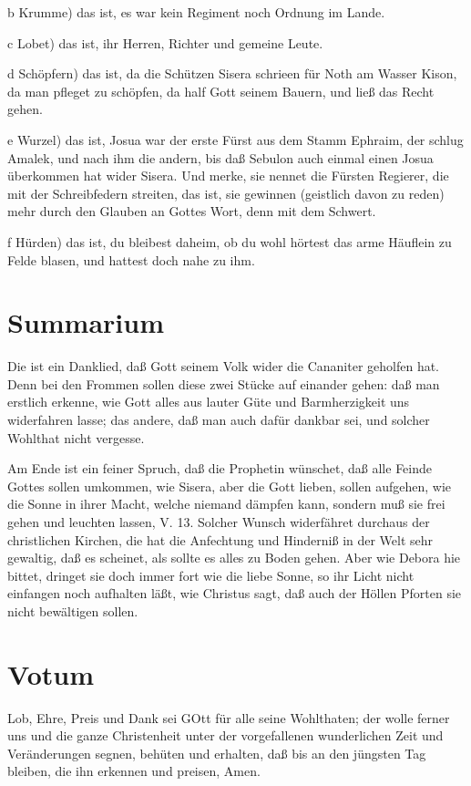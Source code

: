 b Krumme) das ist, es war kein Regiment noch Ordnung im Lande.

c Lobet) das ist, ihr Herren, Richter und gemeine Leute.

d Schöpfern) das ist, da die Schützen Sisera schrieen für Noth am Wasser Kison, da man pfleget zu schöpfen, da half Gott seinem Bauern, und ließ das Recht gehen.

e Wurzel) das ist, Josua war der erste Fürst aus dem Stamm Ephraim, der schlug Amalek, und nach ihm die andern, bis daß Sebulon auch einmal einen Josua überkommen hat wider Sisera. Und merke, sie nennet die Fürsten Regierer, die mit der Schreibfedern streiten, das ist, sie gewinnen (geistlich davon zu reden) mehr durch den Glauben an Gottes Wort, denn mit dem Schwert.

f Hürden) das ist, du bleibest daheim, ob du wohl hörtest das arme Häuflein zu Felde blasen, und hattest doch nahe zu ihm.
\section{Summarium}

Die ist ein Danklied, daß Gott seinem Volk wider die Cananiter geholfen hat. Denn bei den Frommen sollen diese zwei Stücke auf einander gehen: daß man erstlich erkenne, wie Gott alles aus lauter Güte und Barmherzigkeit uns widerfahren lasse; das andere, daß man auch dafür dankbar sei, und solcher Wohlthat nicht vergesse.

Am Ende ist ein feiner Spruch, daß die Prophetin wünschet, daß alle Feinde Gottes sollen umkommen, wie Sisera, aber die Gott lieben, sollen aufgehen, wie die Sonne in ihrer Macht, welche niemand dämpfen kann, sondern muß sie frei gehen und leuchten lassen, V. 13. Solcher Wunsch widerfähret durchaus der christlichen Kirchen, die hat die Anfechtung und Hinderniß in der Welt sehr gewaltig, daß es scheinet, als sollte es alles zu Boden gehen. Aber wie Debora hie bittet, dringet sie doch immer fort wie die liebe Sonne, so ihr Licht nicht einfangen noch aufhalten läßt, wie Christus sagt, daß auch der Höllen Pforten sie nicht bewältigen sollen.

\section{Votum}

Lob, Ehre, Preis und Dank sei GOtt für alle seine Wohlthaten; der wolle ferner uns und die ganze Christenheit unter der vorgefallenen wunderlichen Zeit und Veränderungen segnen, behüten und erhalten, daß bis an den jüngsten Tag bleiben, die ihn erkennen und preisen, Amen.

